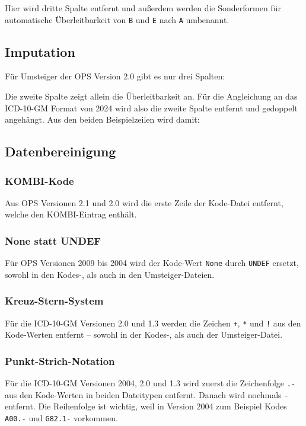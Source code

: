 Hier wird dritte Spalte entfernt und außerdem werden die Sonderformen für automatische Überleitbarkeit von \texttt{B} und \texttt{E} nach \texttt{A} umbenannt. 

\subsection{Imputation}

Für Umsteiger der OPS Version 2.0 gibt es nur drei Spalten: 


Die zweite Spalte zeigt allein die Überleitbarkeit an. Für die Angleichung an das ICD-10-GM Format von 2024 wird also die zweite Spalte entfernt und gedoppelt angehängt. Aus den beiden Beispielzeilen wird damit:


\subsection{Datenbereinigung}

\subsubsection{KOMBI-Kode} Aus OPS Versionen 2.1 und 2.0 wird die erste Zeile der Kode-Datei entfernt, welche den KOMBI-Eintrag enthält. 

 \subsubsection{None statt UNDEF} Für OPS Versionen 2009 bis 2004 wird der Kode-Wert \texttt{None} durch \texttt{UNDEF} ersetzt, sowohl in den Kodes-, als auch in den Umsteiger-Dateien. 

\subsubsection{Kreuz-Stern-System} Für die ICD-10-GM Versionen 2.0 und 1.3 werden die Zeichen \texttt{+}, \texttt{*} und \texttt{!} aus den Kode-Werten entfernt -- sowohl in der Kodes-, als auch der Umsteiger-Datei.

\subsubsection{Punkt-Strich-Notation} Für die ICD-10-GM Versionen 2004, 2.0 und 1.3 wird zuerst die Zeichenfolge \texttt{.-} aus den Kode-Werten in beiden Dateitypen entfernt. Danach wird nochmals \texttt{-} entfernt. Die Reihenfolge ist wichtig, weil in Version 2004 zum Beispiel Kodes \texttt{A00.-} und \texttt{G82.1-} vorkommen. 

